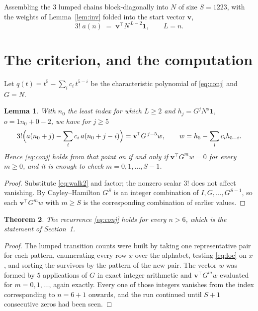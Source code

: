 \documentclass[11pt,a4paper]{article}
\theoremstyle{plain}
\newtheorem{theorem}{Theorem}
\newtheorem{lemma}[theorem]{Lemma}
\theoremstyle{definition}
\begin{document}
Assembling the $3$ lumped chains block-diagonally into $N$ of size $S=1223$, with the
weights of Lemma~\ref{lem:inv} folded into the start vector $\mathbf{v}$,
\begin{equation}\label{eq:walk2}
3!\;a(n)\;=\;\mathbf{v}^{\!\top}N^{\,L-2}\mathbf{1},\qquad L=n .
\end{equation}

\section{The criterion, and the computation}

Let $q(t)=t^{5}-\sum_i c_i\,t^{5-i}$ be the characteristic polynomial of
\eqref{eq:conj} and $G=N$.

\begin{lemma}\label{lem:crit}
With $n_0$ the least index for which $L\ge2$ and $h_j=G^{j}N^{o}\mathbf{1}$,
$o=1n_0+0-2$, we have for $j\ge5$
\[
3!\Bigl(a(n_0+j)-\sum_i c_i\,a(n_0+j-i)\Bigr)
=\mathbf{v}^{\!\top}G^{\,j-5}w,\qquad
w=h_{5}-\sum_i c_i h_{5-i} .
\]
Hence \eqref{eq:conj} holds from that point on if and only if
$\mathbf{v}^{\!\top}G^{m}w=0$ for every $m\ge0$, and it is enough to check
$m=0,1,\dots,S-1$.
\end{lemma}

\begin{proof}
Substitute \eqref{eq:walk2} and factor; the nonzero scalar $3!$ does not affect
vanishing. By Cayley--Hamilton $G^{S}$ is an integer combination of $I,G,\dots,G^{S-1}$,
so each $\mathbf{v}^{\!\top}G^{m}w$ with $m\ge S$ is the corresponding combination of
earlier values.
\end{proof}

\begin{theorem}
The recurrence \eqref{eq:conj} holds for every $n>6$, which is the statement of
Section~1.
\end{theorem}

\begin{proof}
The lumped transition counts were built by taking one representative pair for each pattern,
enumerating every row $x$ over the alphabet, testing \eqref{eq:loc} on $x$, and sorting
the survivors by the pattern of the new pair. The vector $w$ was formed by $5$
applications of $G$ in exact integer arithmetic and $\mathbf{v}^{\!\top}G^{m}w$
evaluated for $m=0,1,\dots$, again exactly. Every one of those integers vanishes from the
index corresponding to $n=6+1$ onwards, and the run continued until $S+1$ consecutive
zeros had been seen.
\end{proof}
\end{document}

